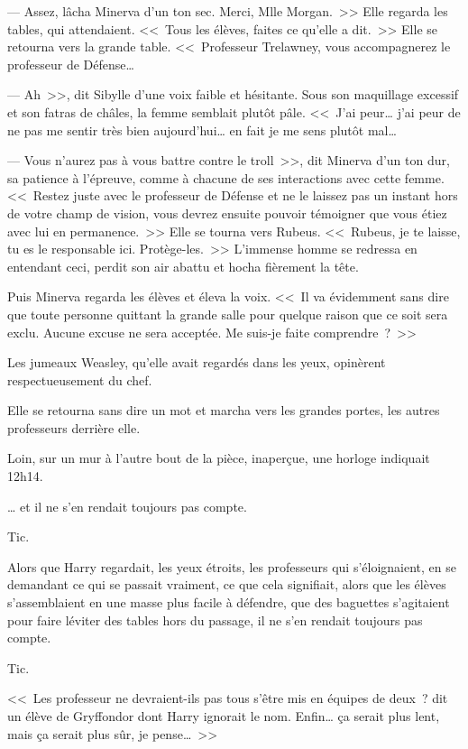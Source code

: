 --- Assez, lâcha Minerva d'un ton sec. Merci, Mlle Morgan.~>> Elle regarda les tables, qui attendaient. <<~Tous les élèves, faites ce qu'elle a dit.~>> Elle se retourna vers la grande table. <<~Professeur Trelawney, vous accompagnerez le professeur de Défense…

--- Ah~>>, dit Sibylle d'une voix faible et hésitante. Sous son maquillage excessif et son fatras de châles, la femme semblait plutôt pâle. <<~J'ai peur… j'ai peur de ne pas me sentir très bien aujourd'hui… en fait je me sens plutôt mal…

--- Vous n'aurez pas à vous battre contre le troll~>>, dit Minerva d'un ton dur, sa patience à l'épreuve, comme à chacune de ses interactions avec cette femme. <<~Restez juste avec le professeur de Défense et ne le laissez pas un instant hors de votre champ de vision, vous devrez ensuite pouvoir témoigner que vous étiez avec lui en permanence.~>> Elle se tourna vers Rubeus. <<~Rubeus, je te laisse, tu es le responsable ici. Protège-les.~>> L'immense homme se redressa en entendant ceci, perdit son air abattu et hocha fièrement la tête.

Puis Minerva regarda les élèves et éleva la voix. <<~Il va évidemment sans dire que toute personne quittant la grande salle pour quelque raison que ce soit sera exclu. Aucune excuse ne sera acceptée. Me suis-je faite comprendre~?~>>

Les jumeaux Weasley, qu'elle avait regardés dans les yeux, opinèrent respectueusement du chef.

Elle se retourna sans dire un mot et marcha vers les grandes portes, les autres professeurs derrière elle.

Loin, sur un mur à l'autre bout de la pièce, inaperçue, une horloge indiquait 12h14.

… et il ne s'en rendait toujours pas compte.

Tic.

Alors que Harry regardait, les yeux étroits, les professeurs qui s'éloignaient, en se demandant ce qui se passait vraiment, ce que cela signifiait, alors que les élèves s'assemblaient en une masse plus facile à défendre, que des baguettes s'agitaient pour faire léviter des tables hors du passage, il ne s'en rendait toujours pas compte.

Tic.

<<~Les professeur ne devraient-ils pas tous s'être mis en équipes de deux~? dit un élève de Gryffondor dont Harry ignorait le nom. Enfin… ça serait plus lent, mais ça serait plus sûr, je pense…~>>

